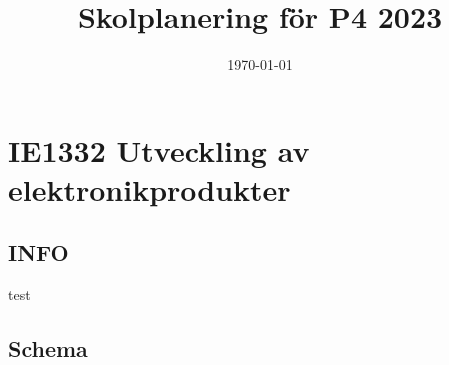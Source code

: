 \documentclass[11pt]{article}
\date{\today}
\title{Skolplanering för P4 2023}
\begin{document}
\maketitle
\tableofcontents


\section{IE1332 Utveckling av elektronikprodukter}
\label{sec:orgc5efe75}
\subsection{INFO}
\label{sec:orgbf3345a}
test

\subsection{Schema}
\label{sec:orga08067d}
\end{document}
